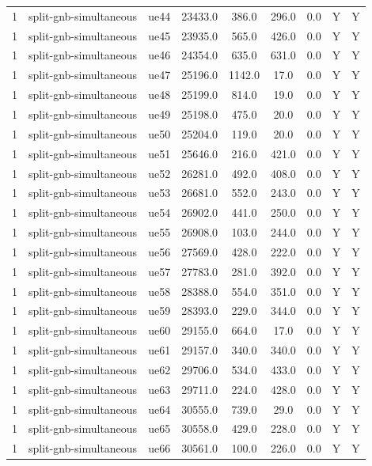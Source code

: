 \begin{table}[ht]
\begin{tabular}{|c|c|c|c|c|c|c|c|c|}
1 & split-gnb-simultaneous & ue44 & 23433.0 & 386.0 & 296.0 & 0.0 & Y & Y \\
1 & split-gnb-simultaneous & ue45 & 23935.0 & 565.0 & 426.0 & 0.0 & Y & Y \\
1 & split-gnb-simultaneous & ue46 & 24354.0 & 635.0 & 631.0 & 0.0 & Y & Y \\
1 & split-gnb-simultaneous & ue47 & 25196.0 & 1142.0 & 17.0 & 0.0 & Y & Y \\
1 & split-gnb-simultaneous & ue48 & 25199.0 & 814.0 & 19.0 & 0.0 & Y & Y \\
1 & split-gnb-simultaneous & ue49 & 25198.0 & 475.0 & 20.0 & 0.0 & Y & Y \\
1 & split-gnb-simultaneous & ue50 & 25204.0 & 119.0 & 20.0 & 0.0 & Y & Y \\
1 & split-gnb-simultaneous & ue51 & 25646.0 & 216.0 & 421.0 & 0.0 & Y & Y \\
1 & split-gnb-simultaneous & ue52 & 26281.0 & 492.0 & 408.0 & 0.0 & Y & Y \\
1 & split-gnb-simultaneous & ue53 & 26681.0 & 552.0 & 243.0 & 0.0 & Y & Y \\
1 & split-gnb-simultaneous & ue54 & 26902.0 & 441.0 & 250.0 & 0.0 & Y & Y \\
1 & split-gnb-simultaneous & ue55 & 26908.0 & 103.0 & 244.0 & 0.0 & Y & Y \\
1 & split-gnb-simultaneous & ue56 & 27569.0 & 428.0 & 222.0 & 0.0 & Y & Y \\
1 & split-gnb-simultaneous & ue57 & 27783.0 & 281.0 & 392.0 & 0.0 & Y & Y \\
1 & split-gnb-simultaneous & ue58 & 28388.0 & 554.0 & 351.0 & 0.0 & Y & Y \\
1 & split-gnb-simultaneous & ue59 & 28393.0 & 229.0 & 344.0 & 0.0 & Y & Y \\
1 & split-gnb-simultaneous & ue60 & 29155.0 & 664.0 & 17.0 & 0.0 & Y & Y \\
1 & split-gnb-simultaneous & ue61 & 29157.0 & 340.0 & 340.0 & 0.0 & Y & Y \\
1 & split-gnb-simultaneous & ue62 & 29706.0 & 534.0 & 433.0 & 0.0 & Y & Y \\
1 & split-gnb-simultaneous & ue63 & 29711.0 & 224.0 & 428.0 & 0.0 & Y & Y \\
1 & split-gnb-simultaneous & ue64 & 30555.0 & 739.0 & 29.0 & 0.0 & Y & Y \\
1 & split-gnb-simultaneous & ue65 & 30558.0 & 429.0 & 228.0 & 0.0 & Y & Y \\
1 & split-gnb-simultaneous & ue66 & 30561.0 & 100.0 & 226.0 & 0.0 & Y & Y \\

\end{tabular}
\end{table}
